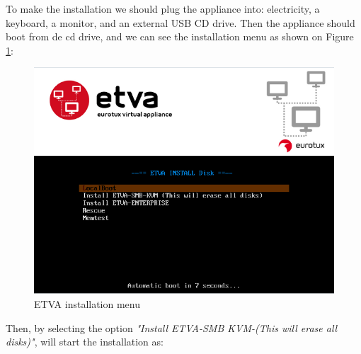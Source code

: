 To make the installation we should plug the appliance into: electricity, a keyboard, a monitor, and an external USB CD drive.
Then the appliance should boot from de cd drive, and we can see the installation menu as shown on Figure \ref{fig:boot_install_screen_standard}:

\begin{figure}[H]
	\begin{center}
	\includegraphics[scale=0.6]{screenshots/install_etva1.png}
	\caption{ETVA installation menu}
	\label{fig:boot_install_screen_standard}
	\end{center}
\end{figure}

Then, by selecting the option \emph{"Install ETVA-SMB KVM-(This will erase all disks)"}, will start the installation as:

